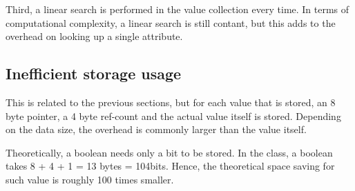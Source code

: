 Third, a linear search is performed in the value collection every time. In terms of computational complexity, a linear search is still contant, but this adds to the overhead on looking up a single attribute.

\subsection{Inefficient storage usage}
\label{sub:Inefficient storage usage}
This is related to the previous sections, but for each value that is stored, an 8 byte pointer, a 4 byte ref-count and the actual value itself is stored. Depending on the data size, the overhead is commonly larger than the value itself.

Theoretically, a boolean needs only a bit to be stored. In the  class, a boolean takes 8 + 4 + 1 = 13 bytes = 104bits. Hence, the theoretical space saving for such value is roughly 100 times smaller.


